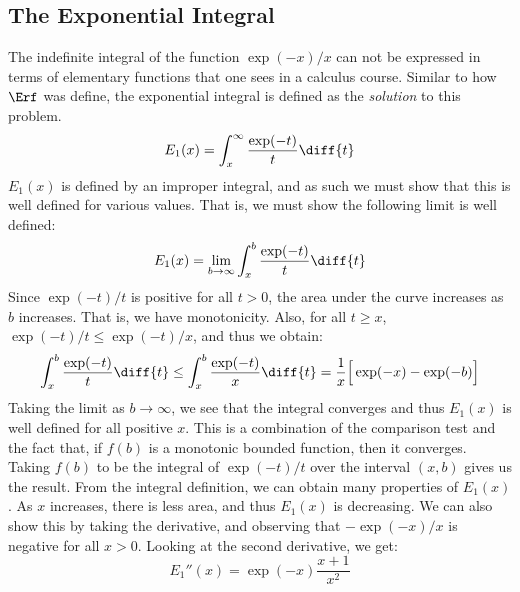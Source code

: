         \subsection{The Exponential Integral}
            The indefinite integral of the function
            $\exp(-x)/x$ can not be expressed in terms of
            elementary functions that one sees in a calculus course.
            Similar to how $\Erf$ was define, the exponential
            integral is defined as the \textit{solution} to this
            problem.
            \begin{equation}
                E_{1}(x)=\int_{x}^{\infty}\frac{\exp(-t)}{t}\diff{t}
            \end{equation}
            $E_{1}(x)$ is defined by an improper integral, and
            as such we must show that this is well defined for
            various values. That is, we must show the following
            limit is well defined:
            \begin{equation}
                E_{1}(x)=\underset{b\rightarrow\infty}{\lim}
                \int_{x}^{b}\frac{\exp(-t)}{t}\diff{t}
            \end{equation}
            Since $\exp(-t)/t$ is positive for all
            $t>0$, the area under the curve increases as $b$
            increases. That is, we have monotonicity. Also, for
            all $t\geq{x}$, $\exp(-t)/t\leq\exp(-t)/x$, and thus
            we obtain:
            \begin{equation}
                \int_{x}^{b}\frac{\exp(-t)}{t}\diff{t}
                \leq\int_{x}^{b}\frac{\exp(-t)}{x}\diff{t}
                =\frac{1}{x}\Big[\exp(-x)-\exp(-b)\Big]
            \end{equation}
            Taking the limit as $b\rightarrow\infty$, we see
            that the integral converges and thus $E_{1}(x)$ is
            well defined for all positive $x$. This is a combination
            of the comparison test and the fact that, if
            $f(b)$ is a monotonic bounded function, then it
            converges. Taking $f(b)$ to be the integral of
            $\exp(-t)/t$ over the interval $(x,b)$ gives us the
            result. From the integral definition, we can obtain
            many properties of $E_{1}(x)$. As $x$ increases, there
            is less area, and thus $E_{1}(x)$ is decreasing.
            We can also show this by taking the derivative, and
            observing that $-\exp(-x)/x$ is negative for all
            $x>0$. Looking at the second derivative, we get:
            \begin{equation}
                E_{1}''(x)=\exp(-x)\frac{x+1}{x^{2}}
            \end{equation}
